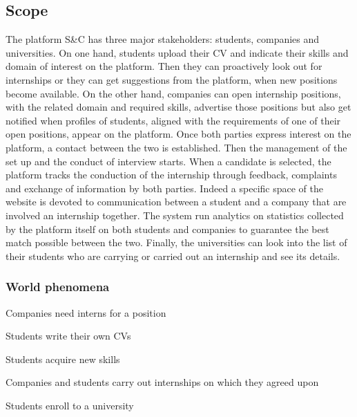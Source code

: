 \subsection{Scope}
    The platform S\&C has three major stakeholders: students, companies and universities. On one hand, students upload their CV and indicate their skills and domain of interest on the platform. Then they can proactively look out for internships or they can get suggestions from the platform, when new positions become available. On the other hand, companies can open internship positions, with the related domain and required skills, advertise those positions but also get notified when profiles of students, aligned with the requirements of one of their open positions, appear on the platform.
    Once both parties express interest on the platform, a contact between the two is established. Then the management of the set up and the conduct of interview starts. When a candidate is selected, the platform tracks the conduction of the internship through feedback, complaints and exchange of information by both parties. Indeed a specific space of the website is devoted to communication between a student and a company that are involved an internship together. The system run analytics on statistics collected by the platform itself on both students and companies to guarantee the best match possible between the two.
    Finally, the universities can look into the list of their students who are carrying or carried out an internship and see its details.

    \newpage
    \subsubsection{World phenomena}
        \begin{enumerate}[label={[WP\arabic*]}]
            \item {Companies need interns for a position}
            \item {Students write their own CVs}
            \item {Students acquire new skills }
            \item {Companies and students carry out internships on which they agreed upon}
            \item {Students enroll to a university}
        \end{enumerate}

    
